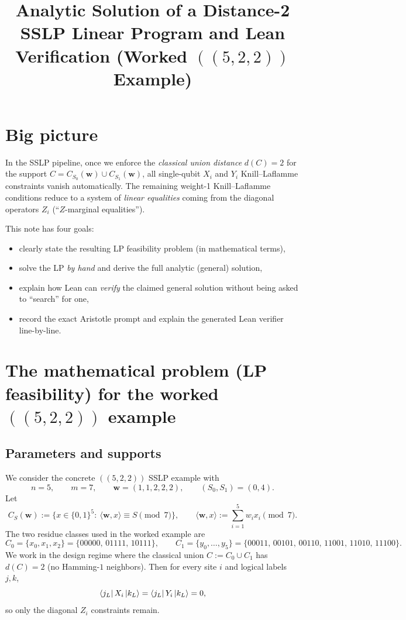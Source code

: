 \documentclass[11pt]{article}
\title{Analytic Solution of a Distance-2 SSLP Linear Program and Lean Verification (Worked $((5,2,2))$ Example)}
\author{}
\date{}
\begin{document}
\maketitle
\tableofcontents

\section{Big picture}

In the SSLP pipeline, once we enforce the \emph{classical union distance} $d(C)=2$ for the support
$C=C_{S_0}(\mathbf w)\cup C_{S_1}(\mathbf w)$,
all single-qubit $X_i$ and $Y_i$ Knill--Laflamme constraints vanish automatically.
The remaining weight-1 Knill--Laflamme conditions reduce to a system of \emph{linear equalities}
coming from the diagonal operators $Z_i$ (``$Z$-marginal equalities'').

This note has four goals:
\begin{itemize}
\item clearly state the resulting LP feasibility problem (in mathematical terms),
\item solve the LP \emph{by hand} and derive the full analytic (general) solution,
\item explain how Lean can \emph{verify} the claimed general solution without being asked to ``search'' for one,
\item record the exact Aristotle prompt and explain the generated Lean verifier line-by-line.
\end{itemize}

\section{The mathematical problem (LP feasibility) for the worked $((5,2,2))$ example}

\subsection{Parameters and supports}

We consider the concrete $((5,2,2))$ SSLP example with
\[
n=5,\qquad m=7,\qquad \mathbf w=(1,1,2,2,2),\qquad (S_0,S_1)=(0,4).
\]
Let
\[
C_S(\mathbf w):=\{x\in\{0,1\}^5:\ \langle\mathbf w,x\rangle\equiv S \!\!\!\pmod 7\},
\qquad
\langle\mathbf w,x\rangle:=\sum_{i=1}^5 w_i x_i \pmod 7.
\]
The two residue classes used in the worked example are
\[
C_0=\{x_0,x_1,x_2\}=\{00000,\,01111,\,10111\},
\qquad
C_1=\{y_0,\dots,y_5\}=\{00011,\,00101,\,00110,\,11001,\,11010,\,11100\}.
\]
We work in the design regime where the classical union $C:=C_0\cup C_1$ has $d(C)=2$ (no Hamming-$1$ neighbors).
Then for every site $i$ and logical labels $j,k$,
\[
\bra{j_L}X_i\ket{k_L}=\bra{j_L}Y_i\ket{k_L}=0,
\]
so only the diagonal $Z_i$ constraints remain.
\end{document}
